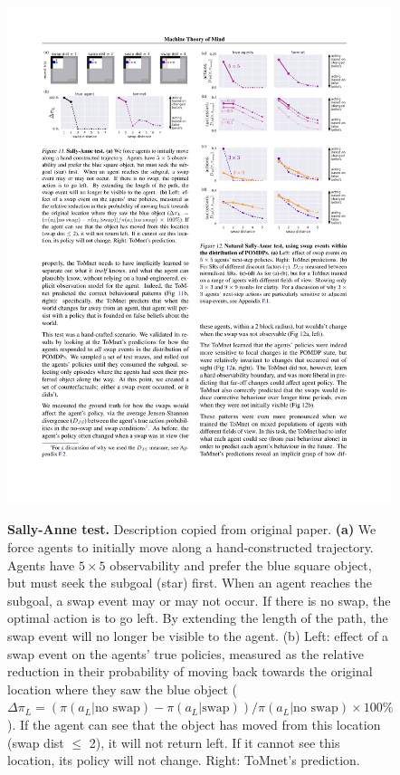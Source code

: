 \documentclass[twocolumn,superscriptaddress,aps]{revtex4-1}
\begin{document}
\begin{figure}[!htb]
\includegraphics[width=\linewidth, height=\textheight, keepaspectratio]{figs/exp4-2}
\label{fig:exp42}
\caption{\textbf{Sally-Anne test.} Description copied from original paper. \textbf{(a)} We force agents to initially move along a hand-constructed trajectory. Agents have $5 \times 5$ observability and prefer the blue square object, but must seek the subgoal (star) first. When an agent reaches the subgoal, a swap event may or may not occur. If there is no swap, the optimal action is to go left. By extending the length of the path, the swap event will no longer be visible to the agent. (b) Left: effect of a swap event on the agents’ true policies, measured as the relative reduction in their probability of moving back towards the original location where they saw the blue object ($\Delta\pi_L = (\pi(a_L|\text{no swap}) - \pi(a_L|\text{swap}))/\pi(a_L|\text{no swap}) \times 100\%$). If the agent can see that the object has moved from this location (swap dist $\leq$ 2), it will not return left. If it cannot see this location, its policy will not change. Right: ToMnet’s prediction.}
\end{figure}
\end{document}
